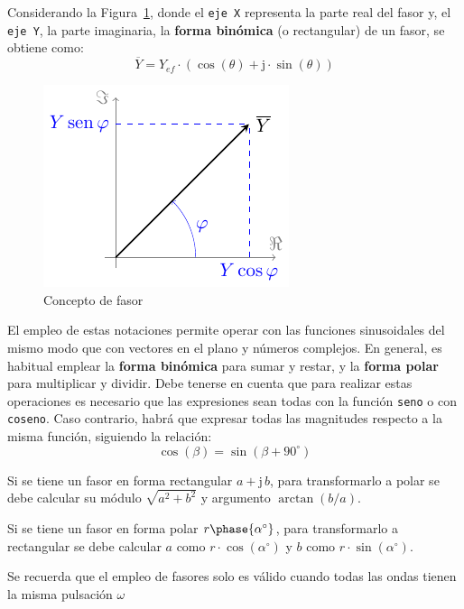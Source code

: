Considerando la Figura~\ref{fig:fasor}, donde el \texttt{eje X}
representa la parte real del fasor y, el \texttt{eje Y}, la parte
imaginaria, la \textbf{forma binómica} (o rectangular) de un fasor, se
obtiene como:
\begin{equation}
  \boxed{\overline{Y} = Y_{ef}\cdot(\cos(\theta)+\mathrm{j}\cdot\sin(\theta))}
\end{equation}
\begin{figure}[H]
  \centering \includegraphics{../figs/fasor.pdf}
  \caption{Concepto de fasor}
  \label{fig:fasor}
\end{figure}
	
El empleo de estas notaciones permite operar con las funciones
sinusoidales del mismo modo que con vectores en el plano y números
complejos. En general, es habitual emplear la \textbf{forma binómica}
para sumar y restar, y la \textbf{forma polar} para multiplicar y
dividir. Debe tenerse en cuenta que para realizar estas operaciones es
necesario que las expresiones sean todas con la función \texttt{seno}
o con \texttt{coseno}. Caso contrario, habrá que expresar todas las
magnitudes respecto a la misma función, siguiendo la relación:
\begin{equation*}
  \cos(\beta)=\sin(\beta+90^\circ)
\end{equation*}
\begin{remark}
  Si se tiene un fasor en forma rectangular $a+\mathrm{j}\,b$, para
  transformarlo a polar se debe calcular su módulo $\sqrt{a^2+b^2}$ y
  argumento $\arctan(b/a)$.
\end{remark}
	
\begin{remark}
  Si se tiene un fasor en forma polar $r\phase{\alpha^\circ}$, para
  transformarlo a rectangular se debe calcular $a$ como
  $r\cdot \cos(\alpha^\circ)$ y $b$ como $r\cdot \sin(\alpha^\circ)$.
\end{remark}
	
\begin{remark}
  Se recuerda que el empleo de fasores solo es válido cuando todas las
  ondas tienen la misma pulsación $\omega$
\end{remark}
	
